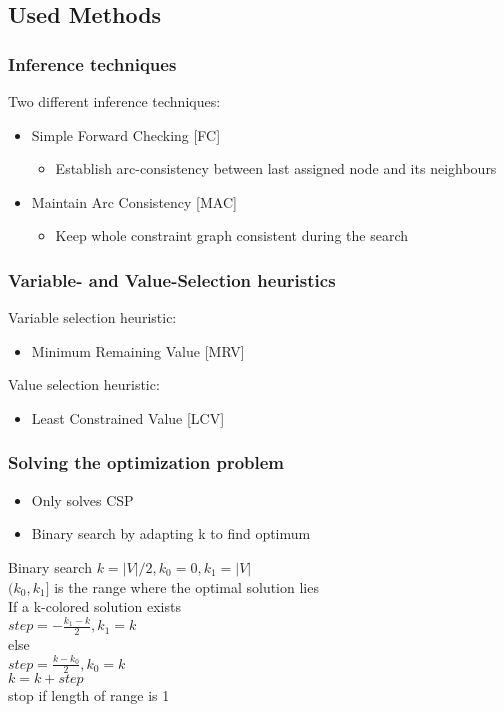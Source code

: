 \documentclass{beamer}
\begin{document}
\subsection{Used Methods}
\begin{frame}
    \frametitle{Inference techniques}
	Two different inference techniques:
	\begin{itemize}
	\item{Simple Forward Checking [FC]}	
		\begin{itemize}	
		\item{Establish arc-consistency between last assigned node and its neighbours}
		\end{itemize}
	\item{Maintain Arc Consistency [MAC]}
	\begin{itemize}	
		\item{Keep whole constraint graph consistent during the search}
		\end{itemize}
	\end{itemize}

  \end{frame}

\begin{frame}
    \frametitle{Variable- and Value-Selection heuristics}
	Variable selection heuristic:
	\begin{itemize}
	\item{Minimum Remaining Value [MRV]}
	\end{itemize}
	Value selection heuristic:
	\begin{itemize}
	\item{Least Constrained Value [LCV]}
	\end{itemize}
  \end{frame}

\begin{frame}
    \frametitle{Solving the optimization problem}
    \begin{itemize}
    \item{Only solves CSP}
	\item{Binary search by adapting k to find optimum}
	\end{itemize}
	\begin{block}{Binary search}
	$k = |V|/2, k_0 = 0, k_1 = |V|$\\
	$(k_0,k_1]$ is the range where the optimal solution lies\\
	If a k-colored solution exists\\
	\quad $step = -\frac{k_1 - k}{2},k_1 = k$\\
	else\\
	\quad $step = \frac{k - k_0}{2}, k_0 = k$\\
	$k = k + step$\\
	stop if length of range is 1
	\end{block}
   \end{frame}
\end{document}
